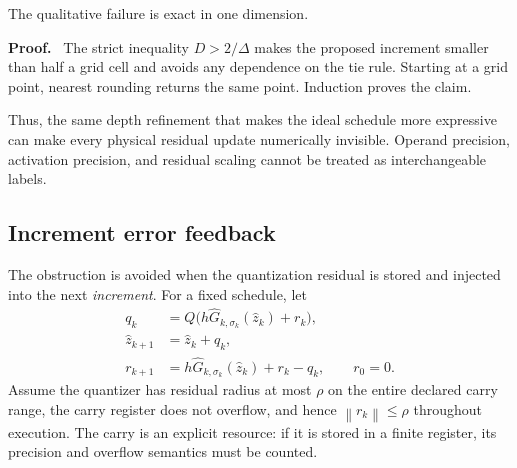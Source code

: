 \documentclass[twoside,11pt]{article}
\renewenvironment{proof}[1][Proof]{\par\noindent\textbf{#1.}\ }{\hfill\BlackBox\par\medskip}
\newcommand{\norm}[1]{\left\lVert #1\right\rVert}
\begin{document}
The qualitative failure is exact in one dimension.


\begin{proof}
The strict inequality $D>2/\Delta$ makes the proposed increment smaller than half a grid cell and avoids any dependence on the tie rule.  Starting at a grid point, nearest rounding returns the same point.  Induction proves the claim.
\end{proof}

Thus, the same depth refinement that makes the ideal schedule more expressive can make every physical residual update numerically invisible.  Operand precision, activation precision, and residual scaling cannot be treated as interchangeable labels.

\subsection{Increment error feedback}

The obstruction is avoided when the quantization residual is stored and injected into the next \emph{increment}.  For a fixed schedule, let
\begin{align}
 q_k&=Q\bigl(h\widehat G_{k,\sigma_k}(\widehat z_k)+r_k\bigr),
 \label{eq:ef-q-main}\\
 \widehat z_{k+1}&=\widehat z_k+q_k,
 \label{eq:ef-state-main}\\
 r_{k+1}&=h\widehat G_{k,\sigma_k}(\widehat z_k)+r_k-q_k,
 \qquad r_0=0.
 \label{eq:ef-carry-main}
\end{align}
Assume the quantizer has residual radius at most $\rho$ on the entire declared carry range, the carry register does not overflow, and hence $\norm{r_k}\le\rho$ throughout execution.  The carry is an explicit resource: if it is stored in a finite register, its precision and overflow semantics must be counted.
\end{document}
